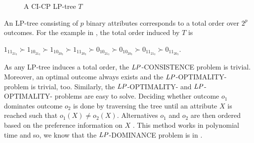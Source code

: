 \begin{figure}
   \small
	\centering

  
  \caption{A CI-CP LP-tree $T$}
  \label{fig:LPTree}
\end{figure}

An LP-tree consisting of $p$ binary attributes corresponds to a total order over
$2^p$ outcomes.  For the example in , the total order induced
by $T$ is
\begin{center}
	$1_11_21_3 \succ 1_10_21_3 \succ 1_10_20_3 \succ 1_11_20_3 
		\succ 0_10_21_3 \succ 0_10_20_3 \succ 0_11_21_3 \succ 0_11_20_3$.
\end{center}

As any LP-tree induces a total order, the $\mathit{LP}$-CONSISTENCE problem is trivial.
Moreover, an optimal outcome always exists and the $\mathit{LP}$-OPTIMALITY- problem
is trivial, too.  Similarly, the $\mathit{LP}$-OPTIMALITY- and
$\mathit{LP}$-OPTIMALITY- problems are easy to solve.
Deciding whether outcome $o_1$ dominates outcome $o_2$ is done by traversing the tree
until an attribute $X$ is reached such that
$o_1(X) \not = o_2(X)$.  Alternatives $o_1$ and $o_2$ are then ordered based on the preference
information on $X$ \cite{booth:learningLP}.
This method works in polynomial time and so, 
we know that the $\mathit{LP}$-DOMINANCE problem is in \bP.

